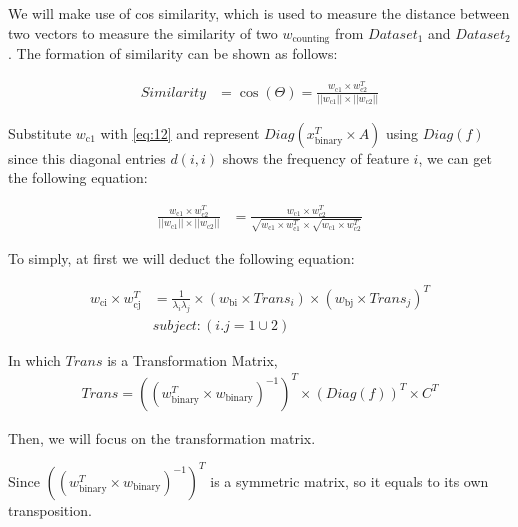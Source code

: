\documentclass{sig-alternate}
\begin{document}
We will make use of cos similarity, which is used to measure the distance between two vectors to measure the similarity of two \(w_{\text{counting}}\) from \(Dataset_{\text{1}}\) and \(Dataset_{\text{2}}\). The formation of similarity can be shown as follows:

\begin{equation} \label{29} 
\begin{split}
Similarity & = \cos(\Theta) = \frac{w_{\text{c1}} \times w_{\text{c2}}^T} {||w_{\text{c1}}|| \times ||w_{\text{c2}}|| }
\end{split}
\end{equation}

Substitute \(w_{\text{c1}}\) with \ref{eq:12} and represent \(Diag(x_{\text{binary}}^T \times A)\) using \(Diag(f)\) since this diagonal entries \(d(i,i) \) shows the frequency of feature \(i\), we can get the following equation:


\begin{equation} \label{30} 
\begin{split}
\frac{w_{\text{c1}} \times w_{\text{c2}}^T} {||w_{\text{c1}}|| \times ||w_{\text{c2}}|| } & =  \frac{w_{\text{c1}} \times w_{\text{c2}}^T} {\sqrt{w_{\text{c1}} \times w_{\text{c1}}^T} \times \sqrt{w_{\text{c1}} \times w_{\text{c2}}^T} }
\end{split}
\end{equation}

To simply, at first we will deduct the following equation:

\begin{equation} \label{31} 
\begin{split}
w_{\text{ci}} \times w_{\text{cj}}^T & = \frac{1}{{\lambda}_{i}{\lambda}_{j} } \times (w_{\text{bi}} \times Trans_{i}) \times (w_{\text{bj}} \times Trans_{j})^T \\
& subject : (i.j = 1 \cup 2)
\end{split}
\end{equation}


In which \(Trans\) is a Transformation Matrix, 
\begin{equation} \label{31} 
\begin{split}
Trans = ((w_{\text{binary}}^T \times w_{\text{binary}})^{-1})^T \times (Diag(f))^T \times C^T  
\end{split}
\end{equation}

Then, we will focus on the transformation matrix. 

Since \(((w_{\text{binary}}^T \times w_{\text{binary}})^{-1})^T\) is a symmetric matrix, so it equals to its own transposition. 
\end{document}
